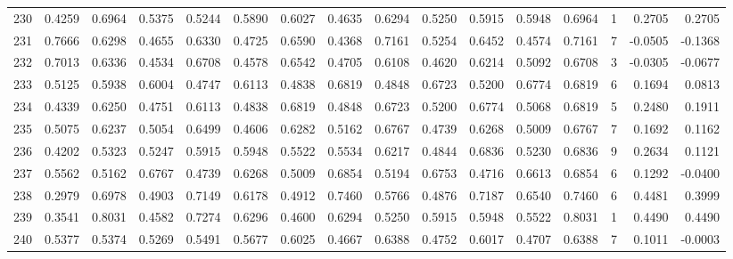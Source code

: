 \begin{tabular}{lrrrrrrrrrrrrrrr}
230 &      0.4259 &  0.6964 &  0.5375 &  0.5244 &  0.5890 &  0.6027 &  0.4635 &  0.6294 &  0.5250 &  0.5915 &   0.5948 &     0.6964 &      1 &                    0.2705 &                     0.2705 \\
231 &      0.7666 &  0.6298 &  0.4655 &  0.6330 &  0.4725 &  0.6590 &  0.4368 &  0.7161 &  0.5254 &  0.6452 &   0.4574 &     0.7161 &      7 &                   -0.0505 &                    -0.1368 \\
232 &      0.7013 &  0.6336 &  0.4534 &  0.6708 &  0.4578 &  0.6542 &  0.4705 &  0.6108 &  0.4620 &  0.6214 &   0.5092 &     0.6708 &      3 &                   -0.0305 &                    -0.0677 \\
233 &      0.5125 &  0.5938 &  0.6004 &  0.4747 &  0.6113 &  0.4838 &  0.6819 &  0.4848 &  0.6723 &  0.5200 &   0.6774 &     0.6819 &      6 &                    0.1694 &                     0.0813 \\
234 &      0.4339 &  0.6250 &  0.4751 &  0.6113 &  0.4838 &  0.6819 &  0.4848 &  0.6723 &  0.5200 &  0.6774 &   0.5068 &     0.6819 &      5 &                    0.2480 &                     0.1911 \\
235 &      0.5075 &  0.6237 &  0.5054 &  0.6499 &  0.4606 &  0.6282 &  0.5162 &  0.6767 &  0.4739 &  0.6268 &   0.5009 &     0.6767 &      7 &                    0.1692 &                     0.1162 \\
236 &      0.4202 &  0.5323 &  0.5247 &  0.5915 &  0.5948 &  0.5522 &  0.5534 &  0.6217 &  0.4844 &  0.6836 &   0.5230 &     0.6836 &      9 &                    0.2634 &                     0.1121 \\
237 &      0.5562 &  0.5162 &  0.6767 &  0.4739 &  0.6268 &  0.5009 &  0.6854 &  0.5194 &  0.6753 &  0.4716 &   0.6613 &     0.6854 &      6 &                    0.1292 &                    -0.0400 \\
238 &      0.2979 &  0.6978 &  0.4903 &  0.7149 &  0.6178 &  0.4912 &  0.7460 &  0.5766 &  0.4876 &  0.7187 &   0.6540 &     0.7460 &      6 &                    0.4481 &                     0.3999 \\
239 &      0.3541 &  0.8031 &  0.4582 &  0.7274 &  0.6296 &  0.4600 &  0.6294 &  0.5250 &  0.5915 &  0.5948 &   0.5522 &     0.8031 &      1 &                    0.4490 &                     0.4490 \\
240 &      0.5377 &  0.5374 &  0.5269 &  0.5491 &  0.5677 &  0.6025 &  0.4667 &  0.6388 &  0.4752 &  0.6017 &   0.4707 &     0.6388 &      7 &                    0.1011 &                    -0.0003 \\

\end{tabular}

